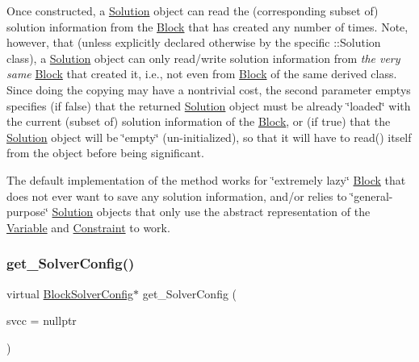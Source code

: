 Once constructed, a \mbox{\hyperlink{class_s_m_spp__di__unipi__it_1_1_solution}{Solution}} object can read the (corresponding subset of) solution information from the \mbox{\hyperlink{class_s_m_spp__di__unipi__it_1_1_block}{Block}} that has created any number of times. Note, however, that (unless explicitly declared otherwise by the specific \+::\+Solution class), a \mbox{\hyperlink{class_s_m_spp__di__unipi__it_1_1_solution}{Solution}} object can only read/write solution information from {\itshape the very same} \mbox{\hyperlink{class_s_m_spp__di__unipi__it_1_1_block}{Block}} that created it, i.\+e., not even from \mbox{\hyperlink{class_s_m_spp__di__unipi__it_1_1_block}{Block}} of the same derived class. Since doing the copying may have a nontrivial cost, the second parameter emptys specifies (if false) that the returned \mbox{\hyperlink{class_s_m_spp__di__unipi__it_1_1_solution}{Solution}} object must be already \char`\"{}loaded\char`\"{} with the current (subset of) solution information of the \mbox{\hyperlink{class_s_m_spp__di__unipi__it_1_1_block}{Block}}, or (if true) that the \mbox{\hyperlink{class_s_m_spp__di__unipi__it_1_1_solution}{Solution}} object will be \char`\"{}empty\char`\"{} (un-\/initialized), so that it will have to read() itself from the object before being significant.

The default implementation of the method works for \char`\"{}extremely lazy\char`\"{} \mbox{\hyperlink{class_s_m_spp__di__unipi__it_1_1_block}{Block}} that does not ever want to save any solution information, and/or relies to \char`\"{}general-\/purpose\char`\"{} \mbox{\hyperlink{class_s_m_spp__di__unipi__it_1_1_solution}{Solution}} objects that only use the abstract representation of the \mbox{\hyperlink{class_s_m_spp__di__unipi__it_1_1_variable}{Variable}} and \mbox{\hyperlink{class_s_m_spp__di__unipi__it_1_1_constraint}{Constraint}} to work. \mbox{\label{class_s_m_spp__di__unipi__it_1_1_block_a412a4ff2922e8d95f80589b1f6522d77}} 
\subsubsection{\texorpdfstring{get\+\_\+\+Solver\+Config()}{get\_SolverConfig()}}
{\footnotesize\ttfamily virtual \mbox{\hyperlink{class_s_m_spp__di__unipi__it_1_1_block_solver_config}{Block\+Solver\+Config}}$\ast$ get\+\_\+\+Solver\+Config (\begin{DoxyParamCaption}\item[{\mbox{\hyperlink{class_s_m_spp__di__unipi__it_1_1_block_solver_config}{Block\+Solver\+Config}} $\ast$}]{svcc = {\ttfamily nullptr} }\end{DoxyParamCaption})\hspace{0.3cm}{\ttfamily [virtual]}}



